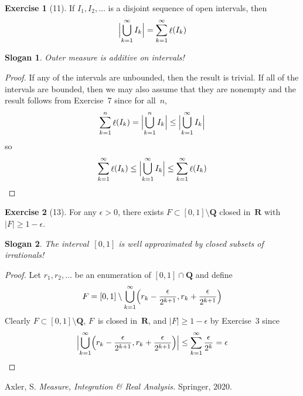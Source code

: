 \documentclass[letterpaper,12pt]{article}
\newcommand{\Q}{\mathbf{Q}}
\newcommand{\R}{\mathbf{R}}
\newcommand{\bigunion}{\bigcup}
\newcommand{\sect}{\cap}
\DeclareMathOperator{\len}{\ell}
\renewcommand{\l}[1]{\len(#1)}
\newcommand{\m}[1]{|#1|}
\newcommand{\bigmeasure}[1]{\Bigl|#1\Bigr|}
\theoremstyle{definition}
\newtheorem*{exer}{Exercise}
\theoremstyle{remark}
\theoremstyle{plain}
\newtheorem*{slogan}{Slogan}
\begin{document}
\begin{exer}[11]
If \(I_1,I_2,\ldots\) is a disjoint sequence of open intervals, then
\[\bigmeasure{\bigunion_{k=1}^{\infty}I_k}=\sum_{k=1}^{\infty}\l{I_k}\]
\end{exer}
\begin{slogan}
Outer measure is additive on intervals!
\end{slogan}
\begin{proof}
If any of the intervals are unbounded, then the result is trivial. If all of the intervals are bounded, then we may also assume that they are nonempty and the result follows from Exercise~7 since for all~\(n\),
\[\sum_{k=1}^n\l{I_k}=\bigmeasure{\bigunion_{k=1}^n I_k}\le\bigmeasure{\bigunion_{k=1}^{\infty}I_k}\]
so
\[\sum_{k=1}^{\infty}\l{I_k}\le\bigmeasure{\bigunion_{k=1}^{\infty}I_k}\le\sum_{k=1}^{\infty}\l{I_k}\qedhere\]
\end{proof}

\begin{exer}[13]
For any \(\epsilon>0\), there exists \(F\subset[0,1]\setminus\Q\) closed in~\(\R\) with \(\m{F}\ge1-\epsilon\).
\end{exer}
\begin{slogan}
The interval~\([0,1]\) is well approximated by closed subsets of irrationals!
\end{slogan}
\begin{proof}
Let \(r_1,r_2,\ldots\) be an enumeration of \([0,1]\sect\Q\) and define
\[F=[0,1]\setminus\bigunion_{k=1}^{\infty}\Bigl(r_k-\frac{\epsilon}{2^{k+1}},r_k+\frac{\epsilon}{2^{k+1}}\Bigr)\]
Clearly \(F\subset[0,1]\setminus\Q\), \(F\)~is closed in~\(\R\), and \(\m{F}\ge1-\epsilon\) by Exercise~3 since
\[\bigmeasure{\bigunion_{k=1}^{\infty}\Bigl(r_k-\frac{\epsilon}{2^{k+1}},r_k+\frac{\epsilon}{2^{k+1}}\Bigr)}\le\sum_{k=1}^{\infty}\frac{\epsilon}{2^k}=\epsilon\qedhere\]
\end{proof}

\newpage
\begin{thebibliography}{0}
 Axler, S. \textit{Measure, Integration \& Real Analysis.} Springer, 2020.
\end{thebibliography}
\end{document}
